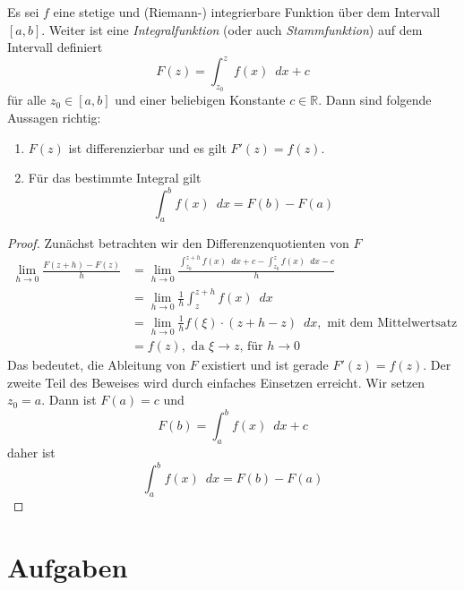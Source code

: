 \begin{satz}
Es sei $f$ eine stetige und (Riemann-) integrierbare Funktion über dem Intervall $[a,b]$. Weiter ist eine \emph{Integralfunktion} (oder auch \emph{Stammfunktion}) auf dem Intervall definiert
\begin{equation}
F(z) = \int_{z_0}^z f(x) \enspace dx + c
\end{equation}
für alle $z_0 \in [a,b]$ und einer beliebigen Konstante $c\in \mathbb{R}$. Dann sind folgende Aussagen richtig:

\begin{enumerate}
\item $F(z)$ ist differenzierbar und es gilt $F'(z) = f(z)$.
\item Für das bestimmte Integral gilt \begin{equation}
\int_a^b f(x) \enspace dx = F(b)-F(a)
\end{equation}
\end{enumerate}
\end{satz}
\begin{proof}
Zunächst betrachten wir den Differenzenquotienten von $F$
\begin{equation}
\begin{split}
\lim_{h\rightarrow 0} \frac{F(z+h)-F(z)}{h} &= \lim_{h\rightarrow 0} \frac{\int_{z_0}^{z+h} f(x)\enspace dx+c - \int_{z_0}^{z} f(x)\enspace dx-c}{h} \\
&= \lim_{h\rightarrow 0}\frac{1}{h} \int_{z}^{z+h} f(x)\enspace dx \\
&= \lim_{h\rightarrow 0}\frac{1}{h} f(\xi)\cdot (z+h-z)\enspace dx, \text{ mit dem Mittelwertsatz} \\
&= f(z), \text{ da }\xi \rightarrow z\text{, für }h\rightarrow 0
\end{split}
\end{equation}
Das bedeutet, die Ableitung von $F$ existiert und ist gerade $F'(z)=f(z)$. Der zweite Teil des Beweises wird durch einfaches Einsetzen erreicht. Wir setzen $z_0 = a$. Dann ist $F(a)=c$ und
\begin{equation*}
F(b) = \int_a^b f(x) \enspace dx +c
\end{equation*}
daher ist
\begin{equation}
\int_a^b f(x) \enspace dx = F(b)-F(a)
\end{equation}
\end{proof}


\section{Aufgaben}